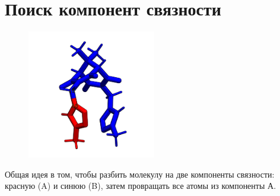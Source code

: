 \documentclass[12pt,a4paper,oneside]{scrarticle}
\begin{document}
\section{Поиск компонент связности}

\begin{figure}[h]
	\centering
	\includegraphics[width=0.5\textwidth]{./img/template_rotate_100}
  \caption{}
	\label{fig:template_rotate}
\end{figure}

Общая идея в том, чтобы разбить молекулу на две компоненты связности: красную (A) и синюю (B), затем провращать все атомы из компоненты А.
\end{document}
